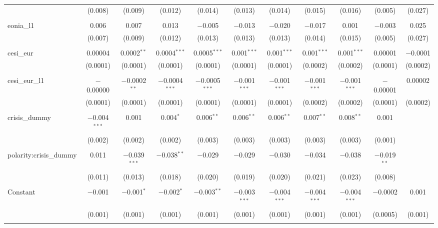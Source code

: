 \begin{table}[!htbp]
\begin{adjustbox}{width=1.35\textwidth}
\begin{tabular}{@{\extracolsep{5pt}}lcccccccccc}
  & (0.008) & (0.009) & (0.012) & (0.014) & (0.013) & (0.014) & (0.015) & (0.016) & (0.005) & (0.027) \\ 
  & & & & & & & & & & \\ 
 eonia\_l1 & 0.006 & 0.007 & 0.013 & $-$0.005 & $-$0.013 & $-$0.020 & $-$0.017 & 0.001 & $-$0.003 & 0.025 \\ 
  & (0.007) & (0.009) & (0.012) & (0.013) & (0.013) & (0.013) & (0.014) & (0.015) & (0.005) & (0.027) \\ 
  & & & & & & & & & & \\ 
 cesi\_eur & 0.00004 & 0.0002$^{**}$ & 0.0004$^{***}$ & 0.0005$^{***}$ & 0.001$^{***}$ & 0.001$^{***}$ & 0.001$^{***}$ & 0.001$^{***}$ & 0.00001 & $-$0.0001 \\ 
  & (0.0001) & (0.0001) & (0.0001) & (0.0001) & (0.0001) & (0.0001) & (0.0002) & (0.0002) & (0.0001) & (0.0002) \\ 
  & & & & & & & & & & \\ 
 cesi\_eur\_l1 & $-$0.00000 & $-$0.0002$^{**}$ & $-$0.0004$^{***}$ & $-$0.0005$^{***}$ & $-$0.001$^{***}$ & $-$0.001$^{***}$ & $-$0.001$^{***}$ & $-$0.001$^{***}$ & $-$0.00001 & 0.00002 \\ 
  & (0.0001) & (0.0001) & (0.0001) & (0.0001) & (0.0001) & (0.0001) & (0.0002) & (0.0002) & (0.0001) & (0.0002) \\ 
  & & & & & & & & & & \\ 
 crisis\_dummy & $-$0.004$^{***}$ & 0.001 & 0.004$^{*}$ & 0.006$^{**}$ & 0.006$^{**}$ & 0.006$^{**}$ & 0.007$^{**}$ & 0.008$^{**}$ & 0.001 &  \\ 
  & (0.002) & (0.002) & (0.002) & (0.003) & (0.003) & (0.003) & (0.003) & (0.003) & (0.001) &  \\ 
  & & & & & & & & & & \\ 
 polarity:crisis\_dummy & 0.011 & $-$0.039$^{***}$ & $-$0.038$^{**}$ & $-$0.029 & $-$0.029 & $-$0.030 & $-$0.034 & $-$0.038 & $-$0.019$^{**}$ &  \\ 
  & (0.011) & (0.013) & (0.018) & (0.020) & (0.019) & (0.020) & (0.021) & (0.023) & (0.008) &  \\ 
  & & & & & & & & & & \\ 
 Constant & $-$0.001 & $-$0.001$^{*}$ & $-$0.002$^{*}$ & $-$0.003$^{**}$ & $-$0.003$^{***}$ & $-$0.004$^{***}$ & $-$0.004$^{***}$ & $-$0.004$^{***}$ & $-$0.0002 & 0.001 \\ 
  & (0.001) & (0.001) & (0.001) & (0.001) & (0.001) & (0.001) & (0.001) & (0.001) & (0.0005) & (0.001) \\ 
  & & & & & & & & & & \\ 

\end{tabular}
\end{adjustbox}
\end{table}
